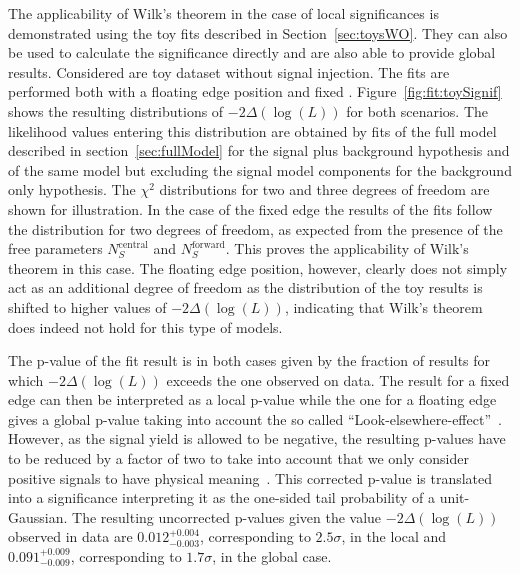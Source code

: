 The applicability of Wilk's theorem in the case of local significances is demonstrated using the toy fits described in Section~\ref{sec:toysWO}. They can also be used to calculate the significance directly and are also able to provide global results. Considered are toy dataset without signal injection. The fits are performed both with a floating edge position and fixed \mlledge. Figure~\ref{fig:fit:toySignif} shows the resulting distributions of $-2\Delta\left(\log\left(L\right)\right)$ for both scenarios. The likelihood values entering this distribution are obtained by fits of the full model described in section~\ref{sec:fullModel} for the signal plus background hypothesis and of the same model but excluding the signal model components for the background only hypothesis. The $\chi^2$ distributions for two and three degrees of freedom are shown for illustration. In the case of the fixed edge the results of the fits follow the distribution for two degrees of freedom, as expected from the presence of the free parameters $N_{S}^{\text{central}}$ and $N_{S}^{\text{forward}}$. This proves the applicability of Wilk's theorem in this case. The floating edge position, however, clearly does not simply act as an additional degree of freedom as the distribution of the toy results is shifted to higher values of $-2\Delta\left(\log\left(L\right)\right)$, indicating that Wilk's theorem does indeed not hold for this type of models.

The p-value of the fit result is in both cases given by the fraction of results for which  $-2\Delta\left(\log\left(L\right)\right)$ exceeds the one observed on data. The result for a fixed edge can then be interpreted as a local p-value while the one for a floating edge gives a global p-value taking into account the so called ``Look-elsewhere-effect''~\cite{GrossVittels}. However, as the signal yield is allowed to be negative, the resulting p-values have to be reduced by a factor of two to take into account that we only consider positive signals to have physical meaning~\cite{GrossVittels}. This corrected p-value is translated into a significance interpreting it as the one-sided tail probability of a unit-Gaussian. The resulting uncorrected p-values given the value  $-2\Delta\left(\log\left(L\right)\right)$ observed in data are $0.012^{+0.004}_{-0.003}$, corresponding to $2.5\sigma$, in the local and $0.091^{+0.009}_{-0.009}$, corresponding to $1.7\sigma$, in the global case.

